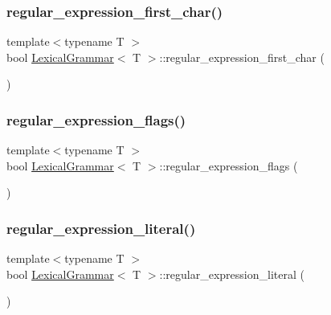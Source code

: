 \subsubsection{\texorpdfstring{regular\+\_\+expression\+\_\+first\+\_\+char()}{regular\_expression\_first\_char()}}
{\footnotesize\ttfamily template$<$typename T $>$ \\
bool \hyperlink{class_lexical_grammar}{Lexical\+Grammar}$<$ T $>$\+::regular\+\_\+expression\+\_\+first\+\_\+char (\begin{DoxyParamCaption}{ }\end{DoxyParamCaption})\hspace{0.3cm}{\ttfamily [inline]}}

\mbox{\label{class_lexical_grammar_adf9549c929bfd16abf7b7b880c9ee3cf}} 
\subsubsection{\texorpdfstring{regular\+\_\+expression\+\_\+flags()}{regular\_expression\_flags()}}
{\footnotesize\ttfamily template$<$typename T $>$ \\
bool \hyperlink{class_lexical_grammar}{Lexical\+Grammar}$<$ T $>$\+::regular\+\_\+expression\+\_\+flags (\begin{DoxyParamCaption}{ }\end{DoxyParamCaption})\hspace{0.3cm}{\ttfamily [inline]}}

\mbox{\label{class_lexical_grammar_a86df93444a68819148ce938342342b84}} 
\subsubsection{\texorpdfstring{regular\+\_\+expression\+\_\+literal()}{regular\_expression\_literal()}}
{\footnotesize\ttfamily template$<$typename T $>$ \\
bool \hyperlink{class_lexical_grammar}{Lexical\+Grammar}$<$ T $>$\+::regular\+\_\+expression\+\_\+literal (\begin{DoxyParamCaption}{ }\end{DoxyParamCaption})\hspace{0.3cm}{\ttfamily [inline]}}


